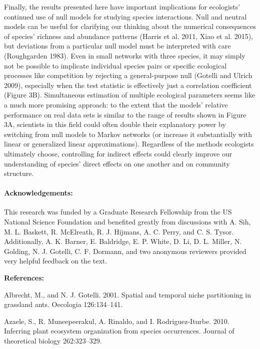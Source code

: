 \documentclass[12pt,]{article}
\begin{document}
\begin{spacing}{1.9}
\begin{flushleft}
Finally, the results presented here have important implications for
ecologists' continued use of null models for studying species
interactions. Null and neutral models can be useful for clarifying our
thinking about the numerical consequences of species' richness and
abundance patterns (Harris et al. 2011, Xiao et al. 2015), but
deviations from a particular null model must be interpreted with care
(Roughgarden 1983). Even in small networks with three species, it may
simply not be possible to implicate individual species pairs or specific
ecological processes like competition by rejecting a general-purpose
null (Gotelli and Ulrich 2009), especially when the test statistic is
effectively just a correlation coefficient (Figure 3B). Simultaneous
estimation of multiple ecological parameters seems like a much more
promising approach: to the extent that the models' relative performance
on real data sets is similar to the range of results shown in Figure 3A,
scientists in this field could often double their explanatory power by
switching from null models to Markov networks (or increase it
substantially with linear or generalized linear approximations).
Regardless of the methods ecologists ultimately choose, controlling for
indirect effects could clearly improve our understanding of species'
direct effects on one another and on community structure.

\paragraph{Acknowledgements:}\label{acknowledgements}

This research was funded by a Graduate Research Fellowship from the US
National Science Foundation and benefited greatly from discussions with
A. Sih, M. L. Baskett, R. McElreath, R. J. Hijmans, A. C. Perry, and C.
S. Tysor. Additionally, A. K. Barner, E. Baldridge, E. P. White, D. Li,
D. L. Miller, N. Golding, N. J. Gotelli, C. F. Dormann, and two
anonymous reviewers provided very helpful feedback on the text.

\setlength{\parindent}{0cm}

\textbf{References:}

\setlength{\parskip}{0pt} \setlength{\parindent}{-1em}
\setlength{\leftskip}{1em}

Albrecht, M., and N. J. Gotelli. 2001. Spatial and temporal niche
partitioning in grassland ants. Oecologia 126:134--141.

Azaele, S., R. Muneepeerakul, A. Rinaldo, and I. Rodriguez-Iturbe. 2010.
Inferring plant ecosystem organization from species occurrences. Journal
of theoretical biology 262:323--329.


\end{flushleft}
\end{spacing}
\end{document}
